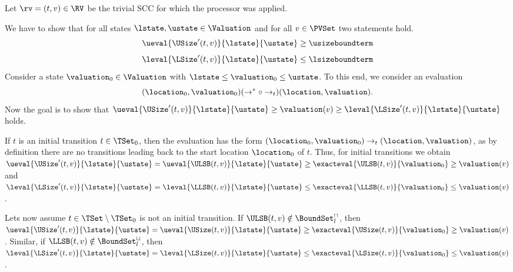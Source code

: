 Let $\rv = (t, v) \in \RV$ be the trivial SCC for which the processor was applied.

We have to show that for all states $\lstate, \ustate \in \Valuation$ and for all $v \in \PVSet$ two statements hold.
\[ \ueval{\USize'(t, v)}{\lstate}{\ustate} \geq \usizeboundterm \]
\[ \leval{\LSize'(t, v)}{\lstate}{\ustate} \leq \lsizeboundterm \]
Consider a state $\valuation_0 \in \Valuation$ with $\lstate \leq \valuation_0 \leq \ustate$.
To this end, we consider an evaluation
\[ (\location_0, \valuation_0) (\rightarrow^* \circ \rightarrow_t) (\location, \valuation). \]
Now the goal is to show that $\ueval{\USize'(t, v)}{\lstate}{\ustate} \geq \valuation(v) \geq \leval{\LSize'(t, v)}{\lstate}{\ustate}$ holds.

If $t$ is an initial transition $t \in \TSet_0$, then the evaluation has the form $(\location_0, \valuation_0) \rightarrow_t (\location, \valuation)$, as by definition there are no transitions leading back to the start location $\location_0$ of $t$.
Thus, for initial transitions we obtain $\ueval{\USize'(t, v)}{\lstate}{\ustate} = \ueval{\ULSB(t, v)}{\lstate}{\ustate} \geq \exacteval{\ULSB(t, v)}{\valuation_0} \geq \valuation(v)$ and $\leval{\LSize'(t, v)}{\lstate}{\ustate} = \leval{\LLSB(t, v)}{\lstate}{\ustate} \leq \exacteval{\LLSB(t, v)}{\valuation_0} \leq \valuation(v)$.

Lets now assume $t \in \TSet \setminus \TSet_0$ is not an initial transition.
If $\ULSB(t,v) \notin \BoundSet^\sqcap_l$, then $\ueval{\USize'(t, v)}{\lstate}{\ustate} = \ueval{\USize(t, v)}{\lstate}{\ustate} \geq \exacteval{\USize(t, v)}{\valuation_0} \geq \valuation(v)$.
Similar, if $\LLSB(t,v) \notin \BoundSet^\sqcup_l$, then $\leval{\LSize'(t, v)}{\lstate}{\ustate} = \leval{\LSize(t, v)}{\lstate}{\ustate} \leq \exacteval{\LSize(t, v)}{\valuation_0} \leq \valuation(v)$.


